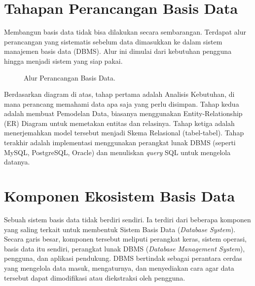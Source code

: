 \documentclass[11pt,a4paper]{article}
\begin{document}
\section{Tahapan Perancangan Basis Data}

Membangun basis data tidak bisa dilakukan secara sembarangan. Terdapat alur perancangan yang sistematis sebelum data dimasukkan ke dalam sistem manajemen basis data (DBMS). Alur ini dimulai dari kebutuhan pengguna hingga menjadi sistem yang siap pakai.

\begin{figure}[H]
	\centering
	\caption{Alur Perancangan Basis Data.}
	\label{fig:design_flow}
\end{figure}

Berdasarkan diagram di atas, tahap pertama adalah Analisis Kebutuhan, di mana perancang memahami data apa saja yang perlu disimpan. Tahap kedua adalah membuat Pemodelan Data, biasanya menggunakan Entity-Relationship (ER) Diagram untuk memetakan entitas dan relasinya. Tahap ketiga adalah menerjemahkan model tersebut menjadi Skema Relasional (tabel-tabel). Tahap terakhir adalah implementasi menggunakan perangkat lunak DBMS (seperti MySQL, PostgreSQL, Oracle) dan menuliskan \textit{query} SQL untuk mengelola datanya.

\section{Komponen Ekosistem Basis Data}

Sebuah sistem basis data tidak berdiri sendiri. Ia terdiri dari beberapa komponen yang saling terkait untuk membentuk Sistem Basis Data (\textit{Database System}). Secara garis besar, komponen tersebut meliputi perangkat keras, sistem operasi, basis data itu sendiri, perangkat lunak DBMS (\textit{Database Management System}), pengguna, dan aplikasi pendukung. DBMS bertindak sebagai perantara cerdas yang mengelola data masuk, mengaturnya, dan menyediakan cara agar data tersebut dapat dimodifikasi atau diekstraksi oleh pengguna.
\end{document}
